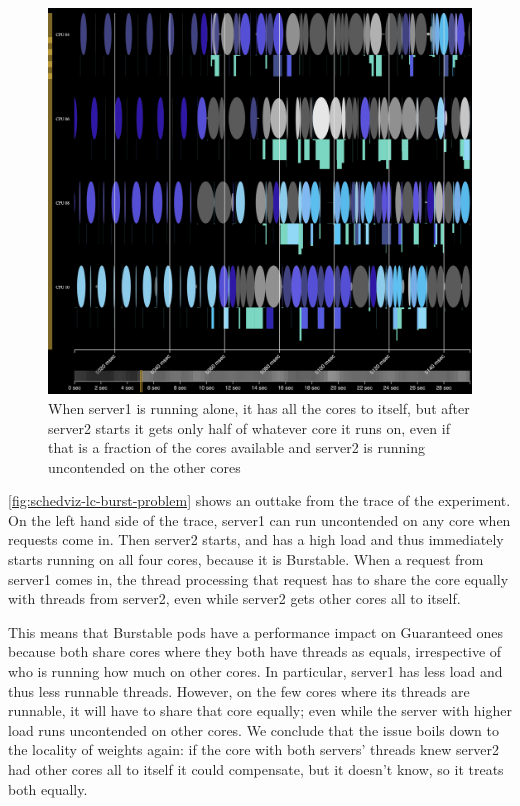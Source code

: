 \begin{figure}[t]
    \centering
    \includegraphics[width=\columnwidth]{graphs/schedviz-lc-burst-problem.png}
    \caption{When server1 is running alone, it has all the cores to itself, but
    after server2 starts it gets only half of whatever core it runs on, even if
    that is a fraction of the cores available and server2 is running uncontended
    on the other cores}\label{fig:schedviz-lc-burst-problem}
\end{figure}

\autoref{fig:schedviz-lc-burst-problem} shows an outtake from the trace of the
experiment. On the left hand side of the trace, server1 can run uncontended on
any core when requests come in. Then server2 starts, and has a high load and
thus immediately starts running on all four cores, because it is Burstable. When
a request from server1 comes in, the thread processing that request has to share
the core equally with threads from server2, even while server2 gets other cores
all to itself.

This means that Burstable pods have a performance impact on Guaranteed ones
because both share cores where they both have threads as equals, irrespective of
who is running how much on other cores. In particular, server1 has less load and
thus less runnable threads. However, on the few cores where its threads are
runnable, it will have to share that core equally; even while the server with
higher load runs uncontended on other cores. We conclude that the issue boils
down to the locality of weights again: if the core with both servers' threads
knew server2 had other cores all to itself it could compensate, but it doesn't
know, so it treats both equally.


